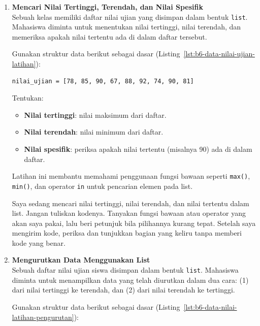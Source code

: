\begin{enumerate}

\item \textbf{Mencari Nilai Tertinggi, Terendah, dan Nilai Spesifik} \\
Sebuah kelas memiliki daftar nilai ujian yang disimpan dalam bentuk \texttt{list}. 
Mahasiswa diminta untuk menentukan nilai tertinggi, nilai terendah, 
dan memeriksa apakah nilai tertentu ada di dalam daftar tersebut.  

Gunakan struktur data berikut sebagai dasar (Listing~\ref{lst:b6-data-nilai-ujian-latihan}):

\begin{lstlisting}[style=PythonStyle, caption={Data nilai ujian untuk latihan}, label={lst:b6-data-nilai-ujian-latihan}]
nilai_ujian = [78, 85, 90, 67, 88, 92, 74, 90, 81]
\end{lstlisting}

Tentukan:
\begin{itemize}
  \item \textbf{Nilai tertinggi}: nilai maksimum dari daftar.
  \item \textbf{Nilai terendah}: nilai minimum dari daftar.
  \item \textbf{Nilai spesifik}: periksa apakah nilai tertentu (misalnya 90) ada di dalam daftar.
\end{itemize}


Latihan ini membantu memahami penggunaan fungsi bawaan seperti 
\texttt{max()}, \texttt{min()}, dan operator \texttt{in} untuk pencarian elemen pada list.

  \begin{promptterarah}
  Saya sedang mencari nilai tertinggi, nilai terendah, dan nilai tertentu dalam list. Jangan tuliskan kodenya. Tanyakan fungsi bawaan atau operator yang akan saya pakai, lalu beri petunjuk bila pilihannya kurang tepat. Setelah saya mengirim kode, periksa dan tunjukkan bagian yang keliru tanpa memberi kode yang benar.
  \end{promptterarah}
\item \textbf{Mengurutkan Data Menggunakan List} \\
Sebuah daftar nilai ujian siswa disimpan dalam bentuk \texttt{list}. 
Mahasiswa diminta untuk menampilkan data yang telah diurutkan dalam dua cara:  
(1) dari nilai tertinggi ke terendah, dan  
(2) dari nilai terendah ke tertinggi.

Gunakan struktur data berikut sebagai dasar (Listing~\ref{lst:b6-data-nilai-latihan-pengurutan}):


\end{enumerate}
